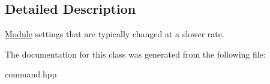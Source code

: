 \subsection{Detailed Description}
\hyperlink{classhebi_1_1Module}{Module} settings that are typically changed at a slower rate. 

The documentation for this class was generated from the following file\+:\begin{DoxyCompactItemize}
\item 
command.\+hpp\end{DoxyCompactItemize}
